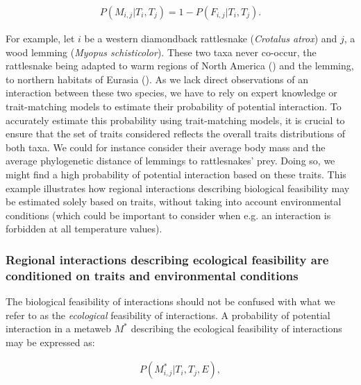\begin{eqnarray}
  \label{eq:forbidden}
  P(M_{i, j} | T_i, T_j) = 1 - P(F_{i, j} | T_i, T_j).
\end{eqnarray}

For example, let $i$ be a western diamondback rattlesnake (\textit{Crotalus
atrox}) and $j$, a wood lemming (\textit{Myopus schisticolor}). These two taxa
never co-occur, the rattlesnake being adapted to warm regions of North America
(\cite{Castoe2007Phylogeographic}) and the lemming, to northern habitats of
Eurasia (\cite{Fedorov2008Comparative}). As we lack direct observations of an
interaction between these two species, we have to rely on expert knowledge or
trait-matching models to estimate their probability of potential interaction. To
accurately estimate this probability using trait-matching models, it is crucial
to ensure that the set of traits considered reflects the overall traits
distributions of both taxa. We could for instance consider their average body
mass and the average phylogenetic distance of lemmings to rattlesnakes' prey.
Doing so, we might find a high probability of potential interaction based on
these traits. This example illustrates how regional interactions describing
biological feasibility may be estimated solely based on traits, without taking
into account environmental conditions (which could be important to consider when
e.g. an interaction is forbidden at all temperature values). 

\subsubsection{Regional interactions describing ecological feasibility are conditioned on traits and environmental conditions}

The biological feasibility of interactions should not be confused with what we
refer to as the \textit{ecological} feasibility of interactions. A probability
of potential interaction in a metaweb $M^*$ describing the ecological
feasibility of interactions may be expressed as: 

\begin{eqnarray}
  \label{eq:metaweb2}
  P(M^*_{i, j} | T_i, T_j, E),
\end{eqnarray}

